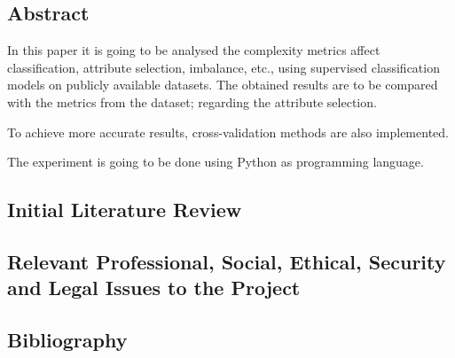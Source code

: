 \documentclass{article}
\begin{document}
\subsection{Abstract}

In this paper it is going to be analysed the complexity metrics affect
classification, attribute selection, imbalance, etc., using supervised 
classification models on publicly available datasets. The obtained results 
are to be compared with the metrics from the dataset; regarding the attribute 
selection.

To achieve more accurate results, cross-validation methods are also implemented.

The experiment is going to be done using Python as programming language.

\subsection{Initial Literature Review}

\subsection{Relevant Professional, Social, Ethical, Security and Legal Issues to
the Project}

\subsection{Bibliography}

\nocite{*}
\printbibliography
\end{document}
